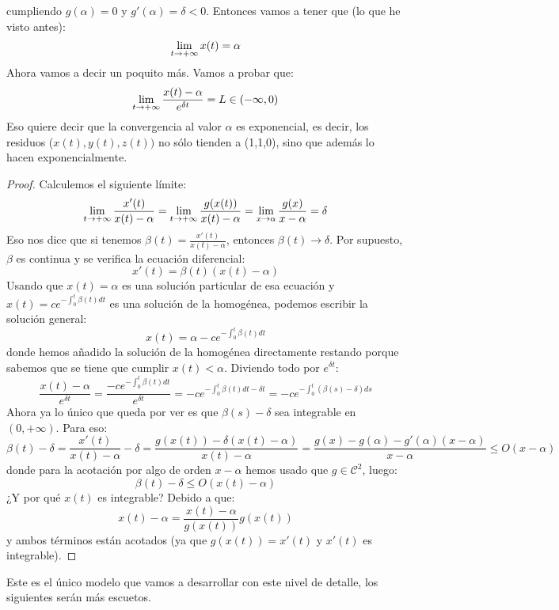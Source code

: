 \begin{example}
cumpliendo $g(\alpha)=0$ y $g'(\alpha)=\delta<0$. Entonces vamos a tener que (lo que he visto antes):
\[
\displaystyle\lim_{  t  \to +\infty }  x(t) =\alpha
\]
Ahora vamos a decir un poquito más. Vamos a probar que:
\[
\displaystyle\lim_{  t  \to +\infty }  \frac{x(t)-\alpha}{e^{\delta t}} =L\in(-\infty,0)
\]
Eso quiere decir que la convergencia al valor $\alpha$ es exponencial, es decir, los residuos ($x(t),y(t),z(t))$ no sólo tienden a (1,1,0), sino que además lo hacen exponencialmente.
\begin{proof}
Calculemos el siguiente límite:
\[
\displaystyle\lim_{  t  \to +\infty }  \frac{x'(t)}{x(t)-\alpha} =\displaystyle\lim_{  t  \to +\infty }  \frac {g(x(t))}{x(t)-\alpha}=\displaystyle\lim_{ x \to \alpha } \frac{g(x)}{x-\alpha}=\delta
\]
Eso nos dice que si tenemos $\beta(t)=\frac{x'(t)}{x(t)-\alpha}$, entonces $\beta(t)\longrightarrow \delta$. Por supuesto, $\beta$ es continua y se verifica la ecuación diferencial:
\[
x'(t)= \beta(t)(x(t)-\alpha)
\]
Usando que $x(t)=\alpha$ es una solución particular de esa ecuación y $x(t)=ce^{-\int_0^t\beta(t)dt}$ es una solución de la homogénea, podemos escribir la solución general:
\[
x(t)=\alpha-ce^{-\int_0^t\beta(t)dt}
\]
donde hemos añadido la solución de la homogénea directamente restando porque sabemos que se tiene que cumplir $x(t)<\alpha$. Diviendo todo por $e^{\delta t}$:
\[
\frac{x(t)-\alpha}{e^{\delta t}}=\frac{-ce^{-\int_0^t\beta(t)dt}}{e^{\delta t}}=-ce^{-\int_0^t\beta(t)dt-\delta t}=-ce^{-\int_0^t\left(\beta(s)-\delta \right)ds}
\]
Ahora ya lo único que queda por ver es que $\beta(s)-\delta$ sea integrable en $(0,+\infty)$. Para eso:
\[
\beta(t)-\delta=\frac{x'(t)}{x(t)-\alpha}-\delta=\frac{g(x(t))-\delta(x(t)-\alpha)}{x(t)-\alpha}=\frac{g(x)-g(\alpha)-g'(\alpha)(x-\alpha) }{x-\alpha}\leq O(x-\alpha)
\]
donde para la acotación por algo de orden $x-\alpha$ hemos usado que $g\in\mathcal{C}^2$, luego:
\[
\beta(t)-\delta\leq O(x(t)-\alpha)
\]
¿Y por qué $x(t)$ es integrable? Debido a que:
\[
x(t)-\alpha = \frac{x(t)-\alpha}{g(x(t))}g(x(t))
\]
y ambos términos están acotados (ya que $g(x(t))=x'(t)$ y $x'(t)$ es integrable).
\end{proof}

Este es el único modelo que vamos a desarrollar con este nivel de detalle, los siguientes serán más escuetos.
\end{example}
